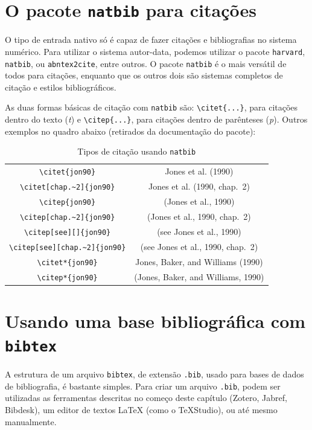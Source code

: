 \section{O pacote \texttt{natbib} para citações}
\label{natbib}
O tipo de entrada nativo só é capaz de fazer citações e bibliografias no sistema numérico. Para utilizar o sistema autor-data, podemos utilizar o pacote \texttt{harvard}, \texttt{natbib}, ou \texttt{abntex2cite}, entre outros.
O pacote \texttt{natbib} é o mais versátil de todos para citações, enquanto que os outros dois são sistemas completos de citação e estilos bibliográficos.

As duas formas básicas de citação com \texttt{natbib} são: \verb+\citet{...}+, para citações dentro do texto (\textit{t}) e \verb+\citep{...}+, para citações dentro de parênteses (\textit{p}). Outros exemplos no quadro abaixo (retirados da documentação do pacote):


\begin{table}
\caption{\label{tab:natbib} Tipos de citação usando \texttt{natbib}}
\begin{tabular}{cc}
  \verb|\citet{jon90}| & Jones et al. (1990)\\
  \verb|\citet[chap.~2]{jon90}| & Jones et al. (1990, chap.~2)\\
  \verb|\citep{jon90}| & (Jones et al., 1990)\\
  \verb|\citep[chap.~2]{jon90}| & (Jones et al., 1990, chap.~2)\\
  \verb|\citep[see][]{jon90}| & (see Jones et al., 1990)\\
  \verb|\citep[see][chap.~2]{jon90}| & (see Jones et al., 1990, chap.~2)\\
  \verb|\citet*{jon90}| & Jones, Baker, and Williams (1990)\\
  \verb|\citep*{jon90}| & (Jones, Baker, and Williams, 1990)
\end{tabular}
\end{table}


\section{Usando uma base bibliográfica com \texttt{bibtex}}
\label{bibtex}

A estrutura de um arquivo \texttt{bibtex}, de extensão \texttt{.bib}, usado para bases de dados de bibliografia, é bastante simples. Para criar um arquivo \texttt{.bib}, podem ser utilizadas as ferramentas descritas no começo deste capítulo (Zotero, Jabref, Bibdesk), um editor de textos \LaTeX{} (como o TeXStudio), ou até mesmo manualmente.

